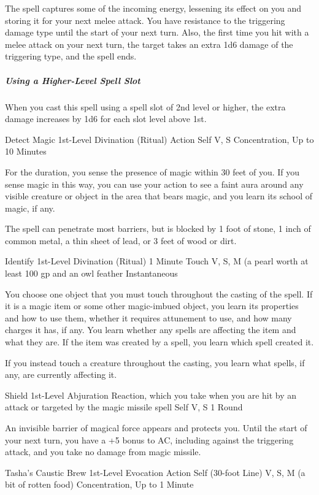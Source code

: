 \documentclass[letterpaper,openany,oneside,twocolumn]{book}
\begin{document}
The spell captures some of the incoming energy, lessening its effect on you and storing it for your next melee attack. You have resistance to the triggering damage type until the start of your next turn. Also, the first time you hit with a melee attack on your next turn, the target takes an extra 1d6 damage of the triggering type, and the spell ends.

\subparagraph*{Using a Higher-Level Spell Slot} When you cast this spell using a spell slot of 2nd level or higher, the extra damage increases by 1d6 for each slot level above 1st.

\DndSpellHeader
  {Detect Magic}
  {1st-Level Divination (Ritual)}
  {Action}
  {Self}
  {V, S}
  {Concentration, Up to 10 Minutes}

For the duration, you sense the presence of magic within 30 feet of you. If you sense magic in this way, you can use your action to see a faint aura around any visible creature or object in the area that bears magic, and you learn its school of magic, if any.

The spell can penetrate most barriers, but is blocked by 1 foot of stone, 1 inch of common metal, a thin sheet of lead, or 3 feet of wood or dirt.

\DndSpellHeader
  {Identify}
  {1st-Level Divination (Ritual)}
  {1 Minute}
  {Touch}
  {V, S, M (a pearl worth at least 100 gp and an owl feather}
  {Instantaneous}

You choose one object that you must touch throughout the casting of the spell. If it is a magic item or some other magic-imbued object, you learn its properties and how to use them, whether it requires attunement to use, and how many charges it has, if any. You learn whether any spells are affecting the item and what they are. If the item was created by a spell, you learn which spell created it.

If you instead touch a creature throughout the casting, you learn what spells, if any, are currently affecting it.

\DndSpellHeader
  {Shield}
  {1st-Level Abjuration}
  {Reaction, which you take when you are hit by an attack or targeted by the magic missile spell}
  {Self}
  {V, S}
  {1 Round}

An invisible barrier of magical force appears and protects you. Until the start of your next turn, you have a +5 bonus to AC, including against the triggering attack, and you take no damage from magic missile.

\DndSpellHeader
  {Tasha's Caustic Brew}
  {1st-Level Evocation}
  {Action}
  {Self (30-foot Line)}
  {V, S, M (a bit of rotten food)}
  {Concentration, Up to 1 Minute}
\end{document}
